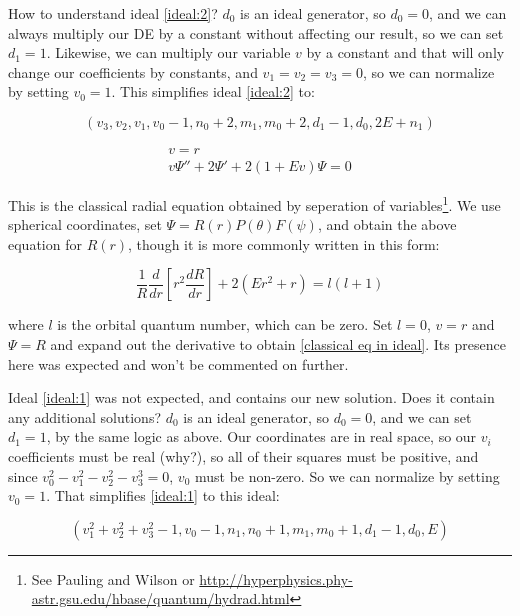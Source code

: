 \documentclass{article}
\begin{document}
How to understand ideal \eqref{ideal:2}?  $d_0$ is an ideal generator,
so $d_0=0$, and we can always multiply our DE by a constant without affecting our result, so we can set $d_1=1$.
Likewise, we can multiply our variable $v$ by a constant and that will only change our coefficients by constants,
and $v_1=v_2=v_3=0$, so we can normalize by setting $v_0=1$.  This simplifies ideal \eqref{ideal:2} to:

\begin{equation}
\left(v_{3}, v_{2}, v_{1}, v_{0} - 1, n_{0} + 2, m_{1}, m_{0} + 2, d_{1} - 1, d_{0}, 2 E + n_{1}\right)
\end{equation}

\begin{equation}
\label{classical eq in ideal}
\begin{gathered}
v=r \\
v \Psi'' + 2 \Psi' + 2(1 + E v) \Psi = 0
\end{gathered}
\end{equation}

This is the classical radial equation obtained by seperation of variables\footnote{See
Pauling and Wilson or
\url{http://hyperphysics.phy-astr.gsu.edu/hbase/quantum/hydrad.html}}.  We use
spherical coordinates, set $\Psi = R(r)P(\theta)F(\psi)$, and obtain the above equation for $R(r)$,
though it is more commonly written in this form:

\begin{equation}
\frac{1}{R} \frac{d}{dr}\left[ r^2 \frac{dR}{dr}\right] + 2(Er^2 + r) = l(l+1)
\end{equation}

where $l$ is the orbital quantum number, which can be zero.  Set $l=0$, $v=r$ and $\Psi=R$ and
expand out the derivative to obtain \eqref{classical eq in ideal}.  Its presence here was
expected and won't be commented on further.

Ideal \eqref{ideal:1} was not expected, and contains our new solution.  Does it contain any additional solutions?
$d_0$ is an ideal generator,
so $d_0=0$, and we can set $d_1=1$, by the same logic as above.
Our coordinates are in real space, so our $v_i$ coefficients must be real (why?), so all of their squares must
be positive, and since $v_0^2-v_1^2-v_2^2-v_3^3=0$, $v_0$ must be non-zero.  So we can normalize by setting $v_0=1$.
That simplifies \eqref{ideal:1} to this ideal:

\begin{equation}
\left(v_{1}^{2} + v_{2}^{2} + v_{3}^{2} - 1, v_{0} - 1, n_{1}, n_{0} + 1, m_{1}, m_{0} + 1, d_{1} - 1, d_{0}, E\right)
\end{equation}
\end{document}
